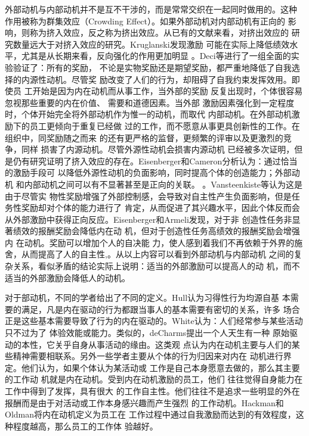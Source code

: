 \documentclass[12pt,a4paper,cs4size]{ctexart}
\begin{document}
外部动机与内部动机并不是互不干涉的，而是常常交织在一起同时做用的。这种
作用被称为群集效应（Crowding Effect）。如果外部动机对内部动机有正向的
影响，则称为挤入效应，反之称为挤出效应。从已有的文献来看，对挤出效应的
研究数量远大于对挤入效应的研究。Kruglanski发现激励
可能在实际上降低绩效水平，尤其是从长期来看，反向强化的作用更加明显
\cite{Kruglanski1978}。Deci等进行了一组全面的实验验证了：所有的奖励，
不论是实物奖励还是期望奖励，都严重地降低了自我选择的内源性动机。尽管奖
励改变了人们的行为，却阻碍了自我约束发挥效用\cite{deci1999mar}。即使员
工开始是因为内在动机而从事工作，当外部的奖励
反复出现时，个体很容易忽视那些重要的内在价值、
需要和道德因素\cite{deci2000agp}。当外部
激励因素强化到一定程度时，个体开始完全将外部动机作为惟一的动机，而取代
内部动机\cite{kasser2002hpm}。在外部动机激励下的员工更倾向于重复已经做
过的工作，而不愿意从事更具创新性的工作\cite{amabile1998kc}\cite{schwartz1993cad}。在组织中，同奖励随之而来
的还有更严格的监督，更频繁的评审以及更激烈的竞争\cite{Kohn1993}，同样
损害了内源动机\cite{deci1985ima}。尽管外源性动机会损害内源动机
已经被多次证明，但是仍有研究证明了挤入效应的存在。Eisenberger和Cameron分析认为：通过恰当的激励手段可
以降低外源性动机的负面影响，同时提高个体的创造能力；外部动机
和内部动机之间可以有不显著甚至是正向的关联。
\cite{eisenberger1996der}。Vansteenkiste等认为这是由于尽管实
物性奖励增强了外部控制感，会导致对自主性产生负面影响，但是任务性奖励却对个体的能力进行了
肯定，从而促进了其兴趣水平，因此个体反而会从外部激励中获得正向反应\cite{vansteenkiste2003ccr}。Eisenberger和Armeli发现，对于非
创造性任务非显著绩效的报酬奖励会降低内在动
机，但对于创造性任务高绩效的报酬奖励会增强内
在动机\cite{eisenberger1997csr}。奖励可以增加个人的自决能
力，使人感到着我们不再依赖于外界的施舍，从而提高了人的自主性\cite{eisenberger1999dpp},\cite{eisenberger1999eri}。从以上内容可以看到外部动机与内部动机
之间的复杂关系，看似矛盾的结论实际上说明：适当的外部激励可以提高人的动
机，而不适当的外部激励会降低人的动机。



对于部动机，不同的学者给出了不同的定义。Hull认为习得性行为均源自基
本需要的满足，凡是内在驱动的行为都跟当事人的基本需要有密切的关系，许多
场合正是这些基本需要导致了行为的内在驱动的\cite{hull1943pbi}。White认为：人们经常参与某些活动只不过为了
体验效能或能力\cite{white66wmr}。类似的，deCharms提出一个人天生有一种
原始驱动的本性，它关乎自身从事活动的缘由\cite{decharms1968pci}。这类观
点认为内在动机主要与人们的某些精神需要相联系\cite{Kanfer1990}。另外一些学者主要从个体的行为归因来对内在
动机进行界定。他们认为，如果个体认为某活动或
工作是自己本身愿意去做的，那么其主要的工作动
机就是内在动机。受到内在动机激励的员工，他们
往往觉得自身能力在工作中得到了发挥，具有很大
的工作自主性。他们往往不是追求一些明显的外在
报酬而是由于对活动或工作本身感兴趣而产生强烈
的工作动机\cite{chenandwu2008}。Hackman和Oldman将内在动机定义为员工在
工作过程中通过自我激励而达到的有效程度，这种程度越高，那么员工的工作体
验越好\cite{hackman1975djd}。
\end{document}
